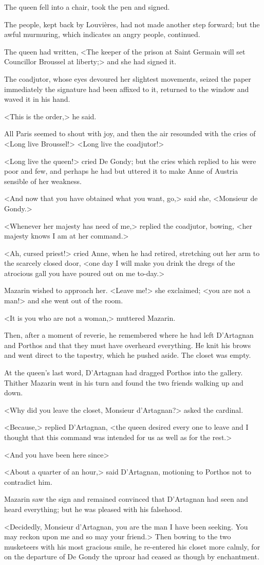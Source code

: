 The queen fell into a chair, took the pen and signed.

The people, kept back by Louvières, had not made another step forward; but the awful murmuring, which indicates an angry people, continued.

The queen had written, <The keeper of the prison at Saint Germain will set Councillor Broussel at liberty;> and she had signed it.

The coadjutor, whose eyes devoured her slightest movements, seized the paper immediately the signature had been affixed to it, returned to the window and waved it in his hand.

<This is the order,> he said.

All Paris seemed to shout with joy, and then the air resounded with the cries of <Long live Broussel!> <Long live the coadjutor!>

<Long live the queen!> cried De Gondy; but the cries which replied to his were poor and few, and perhaps he had but uttered it to make Anne of Austria sensible of her weakness.

<And now that you have obtained what you want, go,> said she, <Monsieur de Gondy.>

<Whenever her majesty has need of me,> replied the coadjutor, bowing, <her majesty knows I am at her command.>

<Ah, cursed priest!> cried Anne, when he had retired, stretching out her arm to the scarcely closed door, <one day I will make you drink the dregs of the atrocious gall you have poured out on me to-day.>

Mazarin wished to approach her. <Leave me!> she exclaimed; <you are not a man!> and she went out of the room.

<It is you who are not a woman,> muttered Mazarin.

Then, after a moment of reverie, he remembered where he had left D'Artagnan and Porthos and that they must have overheard everything. He knit his brows and went direct to the tapestry, which he pushed aside. The closet was empty.

At the queen's last word, D'Artagnan had dragged Porthos into the gallery. Thither Mazarin went in his turn and found the two friends walking up and down.

<Why did you leave the closet, Monsieur d'Artagnan?> asked the cardinal.

<Because,> replied D'Artagnan, <the queen desired every one to leave and I thought that this command was intended for us as well as for the rest.>

<And you have been here since\longdash>

<About a quarter of an hour,> said D'Artagnan, motioning to Porthos not to contradict him.

Mazarin saw the sign and remained convinced that D'Artagnan had seen and heard everything; but he was pleased with his falsehood.

<Decidedly, Monsieur d'Artagnan, you are the man I have been seeking. You may reckon upon me and so may your friend.> Then bowing to the two musketeers with his most gracious smile, he re-entered his closet more calmly, for on the departure of De Gondy the uproar had ceased as though by enchantment. 